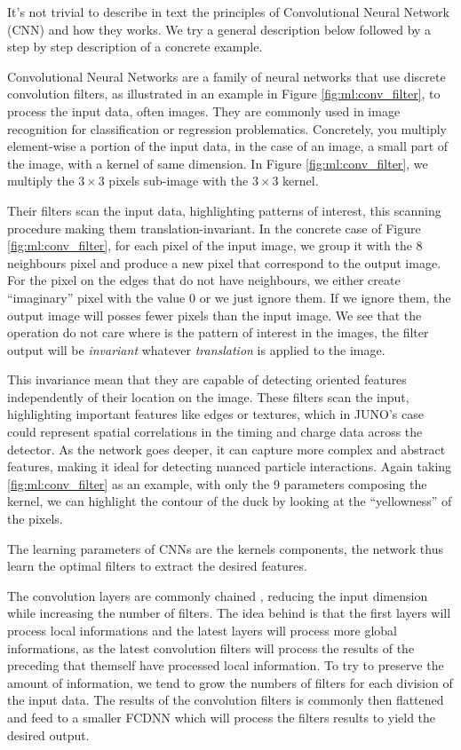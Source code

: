 \documentclass[../main.tex]{subfiles}
\begin{document}
It's not trivial to describe in text the principles of Convolutional Neural Network (CNN) and how they works. We try a general description below followed by a step by step description of a concrete example.

Convolutional Neural Networks are a family of neural networks that use discrete convolution filters, as illustrated in an example in Figure \ref{fig:ml:conv_filter}, to process the input data, often images. They are commonly used in image recognition \cite{russakovsky_imagenet_2015} for classification or regression problematics. Concretely, you multiply element-wise a portion of the input data, in the case of an image, a small part of the image, with a kernel of same dimension. In Figure \ref{fig:ml:conv_filter}, we multiply the $3\times3$ pixels sub-image with the $3\times3$ kernel.

Their filters scan the input data, highlighting patterns of interest, this scanning procedure making them translation-invariant. In the concrete case of Figure \ref{fig:ml:conv_filter}, for each pixel of the input image, we group it with the 8 neighbours pixel and produce a new pixel that correspond to the output image. For the pixel on the edges that do not have neighbours, we either create ``imaginary'' pixel with the value 0 or we just ignore them. If we ignore them, the output image will posses fewer pixels than the input image. We see that the operation do not care where is the pattern of interest in the images, the filter output will be \textit{invariant} whatever \textit{translation} is applied to the image.

This invariance mean that they are capable of detecting oriented features independently of their location on the image.
These filters scan the input, highlighting important features like edges or textures, which in JUNO's case could represent spatial correlations in the timing and charge data across the detector. As the network goes deeper, it can capture more complex and abstract features, making it ideal for detecting nuanced particle interactions.
Again taking \ref{fig:ml:conv_filter} as an example, with only the 9 parameters composing the kernel, we can highlight the contour of the duck by looking at the ``yellowness'' of the pixels.

The learning parameters of CNNs are the kernels components, the network thus learn the optimal filters to extract the desired features.

The convolution layers are commonly chained \cite{simonyan_very_2015}, reducing the input dimension while increasing the number of filters. The idea behind is that the first layers will process local informations and the latest layers will process more global informations, as the latest convolution filters will process the results of the preceding that themself have processed local information. To try to preserve the amount of information, we tend to grow the numbers of filters for each division of the input data.
The results of the convolution filters is commonly then flattened and feed to a smaller FCDNN which will process the filters results to yield the desired output.
\end{document}
